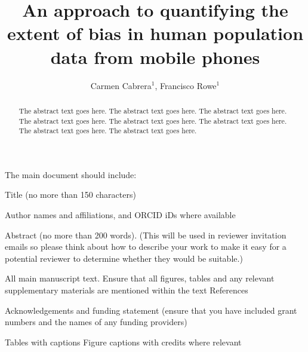 \documentclass[]{rsos}%
\begin{document}
\title{An approach to quantifying the extent of bias in human population data from mobile phones}

\author{
Carmen Cabrera$^{1}$,
Francisco Rowe$^{1}$}

\address{
  $^{1}$Geographic Data Science Lab, Department of Geography and Planning, University of Liverpool, Liverpool, United Kingdom.\\
  $^{}$}
\subject{
subject 1,
subject 2,
subject 3}



\begin{abstract}
The abstract text goes here. The abstract text goes here. The abstract text goes here. The abstract text goes here. The abstract text goes here. The abstract text goes here. The abstract text goes here. The abstract text goes here.
\end{abstract}

\providecommand{\EndFirstPage}{%
}

\maketitle

The main document should include:

Title (no more than 150 characters)

Author names and affiliations, and ORCID iDs where available

Abstract (no more than 200 words). (This will be used in reviewer
invitation emails so please think about how to describe your work to
make it easy for a potential reviewer to determine whether they would be
suitable.)

All main manuscript text. Ensure that all figures, tables and any
relevant supplementary materials are mentioned within the text
References

Acknowledgements and funding statement (ensure that you have included
grant numbers and the names of any funding providers)

Tables with captions Figure captions with credits where relevant
\end{document}
